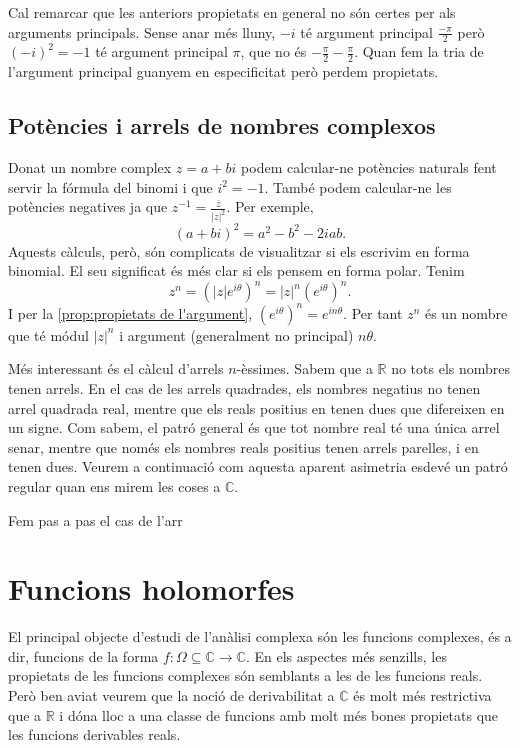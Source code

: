 \documentclass[12pt,twoside]{report}
\numberwithin{table}{section}
\numberwithin{equation}{section}
\numberwithin{figure}{section}
\newcommand{\R}{\ensuremath{\mathbb{R}}}
\newcommand{\C}{\ensuremath{\mathbb{C}}}
\newcommand{\abs}[1]{\left\lvert #1 \right\rvert}
\begin{document}
Cal remarcar que les anteriors propietats en general no són certes per als arguments principals. Sense anar més lluny, \( -i \) té argument principal \( \frac{-\pi}{2} \) però \( (-i)^2 = -1 \) té argument principal \( \pi \), que no és \( -\frac{\pi}{2} - \frac{\pi}{2} \). Quan fem la tria de l'argument principal guanyem en especificitat però perdem propietats.

\section{Potències i arrels de nombres complexos}
Donat un nombre complex \( z = a+bi \) podem calcular-ne potències naturals fent servir la fórmula del binomi i que \( i^2 = -1 \). També podem calcular-ne les potències negatives ja que \( z^{-1} = \frac{\bar{z}}{\abs{z}^2} \). Per exemple, \[ (a + bi)^2 = a^2 - b^2 - 2iab. \] Aquests càlculs, però, són complicats de visualitzar si els escrivim en forma binomial. El seu significat és més clar si els pensem en forma polar. Tenim
\begin{equation*}
	z^n = \left(\abs{z} e^{i\theta}\right)^n = \abs{z}^n (e^{i\theta})^n.
\end{equation*}
I per la \cref{prop:propietats de l'argument}, \( (e^{i\theta})^n = e^{in\theta} \). Per tant \( z^n \) és un nombre que té módul \( \abs{z}^n \) i argument (generalment no principal) \( n\theta \). 

Més interessant és el càlcul d'arrels \( n \)-èssimes. Sabem que a \( \R \) no tots els nombres tenen arrels. En el cas de les arrels quadrades, els nombres negatius no tenen arrel quadrada real, mentre que els reals positius en tenen dues que difereixen en un signe. Com sabem, el patró general és que tot nombre real té una única arrel senar, mentre que només els nombres reals positius tenen arrels parelles, i en tenen dues. Veurem a continuació com aquesta aparent asimetria esdevé un patró regular quan ens mirem les coses a \( \C \). 

Fem pas a pas el cas de l'arr

\chapter{Funcions holomorfes}
El principal objecte d'estudi de l'anàlisi complexa són les funcions complexes, és a dir, funcions de la forma \( f \colon \Omega \subseteq \C \to \C \). En els aspectes més senzills, les propietats de les funcions complexes són semblants a les de les funcions reals. Però ben aviat veurem que la noció de derivabilitat a \( \C \) és molt més restrictiva que a \( \R \) i dóna lloc a una classe de funcions amb molt més bones propietats que les funcions derivables reals.
\end{document}
